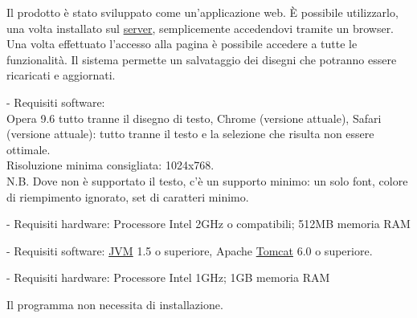  
Il prodotto \`e stato sviluppato come un'applicazione web. \`E possibile utilizzarlo, una volta installato sul \underline{server}, semplicemente accedendovi tramite un browser. Una volta effettuato l'accesso alla pagina \`e possibile accedere a tutte le
funzionalit\`a. Il sistema permette un salvataggio dei disegni che potranno essere ricaricati e aggiornati.
 
\begin{elencopuntato}[\normindent]
    \item[-] Requisiti software:  \\
     Opera 9.6 tutto tranne il disegno di testo, Chrome (versione attuale), Safari (versione attuale): tutto tranne il testo e la selezione che risulta non essere ottimale.\\
    Risoluzione minima consigliata: 1024x768.\\
N.B. Dove non \`e supportato il testo, c'\`e un supporto minimo: un solo font, colore di riempimento ignorato, set di caratteri minimo.
    \item[-] Requisiti hardware: Processore Intel 2GHz o compatibili; 512MB memoria RAM
\end{elencopuntato}
\begin{elencopuntato}[\normindent]
    \item[-] Requisiti software: \underline{JVM} 1.5 o superiore, Apache \underline{Tomcat} 6.0 o superiore.
    \item[-] Requisiti hardware: Processore Intel 1GHz; 1GB memoria RAM
\end{elencopuntato}
 
 
Il programma non necessita di installazione.
 

